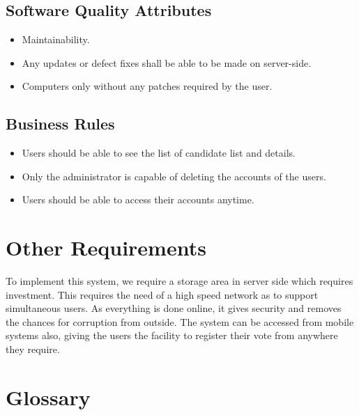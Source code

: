 \documentclass[12pt,a4paper,oneside]{report}
\begin{document}
\section {Software Quality Attributes	}
\begin{itemize}
\item	Maintainability.
\item Any updates or defect fixes shall be able to be made on server-side.
\item Computers only without any patches required by the user.
\end{itemize}
\section {Business Rules}
\begin{itemize}
\item	Users should be able to see the list of candidate list and details.
\item	Only the administrator is capable of deleting the accounts of the users.
\item	Users should be able to access their accounts anytime.
\end{itemize}

\chapter{Other Requirements}
To implement this system, we require a storage area in server side which requires investment. This requires the need of a high speed network as to support simultaneous users. As everything is done online, it gives security and removes the chances for corruption from outside. The system can be accessed from mobile systems also, giving the users the facility to register their vote from anywhere they require.

\vspace{.4 in }

\newpage

\chapter{Glossary}


\end{document}
